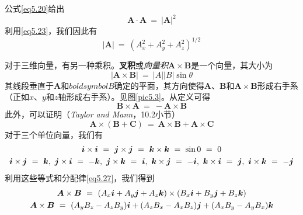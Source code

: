 \documentclass[12pt,a4paper,openany]{ctexbook}
\newcommand{\abs}[1]{\left| #1 \right|}
\begin{document}
\begin{flushleft}
公式\eqref{eq5.20}给出
\begin{equation}
    \boxed{\boldsymbol{A}\cdot\boldsymbol{A}\ =\ \abs{\boldsymbol{A}}^2} \label{eq5.24}
\end{equation}
利用\eqref{eq5.23}，我们因此有
\begin{equation}
    \abs{\boldsymbol{A}}\ =\ (A_x^2+A_y^2+A_z^2)^{1/2} \label{eq5.25}
\end{equation}

对于三维向量，有另一种乘积。\textbf{叉积}或\textit{向量积}$\boldsymbol{A}\times\boldsymbol{B}$是一个向量，其大小为
\begin{equation}
    \abs{\boldsymbol{A}\times\boldsymbol{B}}\ =\ \abs{A}\abs{B}\sin\theta \label{eq5.26}
\end{equation}
其线段垂直于$\boldsymbol{A}$和$boldsymbol{B}$确定的平面，其方向使得$\boldsymbol{A}$、$\boldsymbol{B}$和$\boldsymbol{A}\times\boldsymbol{B}$形成右手系（正如$x$、$y$和$z$轴形成右手系）。见图\ref{pic5.3}。从定义可得
\begin{equation*}
    \boldsymbol{B}\times\boldsymbol{A}\ =\ -\boldsymbol{A}\times\boldsymbol{B}
\end{equation*}
此外，可以证明（\textit{Taylor and Mann}，10.2小节）
\begin{equation}
    \boldsymbol{A}\times(\boldsymbol{B}+\boldsymbol{C})\ =\ \boldsymbol{A}\times\boldsymbol{B}+\boldsymbol{A}\times\boldsymbol{C} \label{eq5.27}
\end{equation}
对于三个单位向量，我们有
\begin{gather*}
    \boldsymbol{i}\times\boldsymbol{i}\ =\ \boldsymbol{j}\times\boldsymbol{j}\ =\ \boldsymbol{k}\times\boldsymbol{k}\ =\ \sin 0\ =\ 0 \notag \\
    \boldsymbol{i}\times\boldsymbol{j}\ =\ \boldsymbol{k},\ \boldsymbol{j}\times\boldsymbol{i}\ =\ -\boldsymbol{k},\ \boldsymbol{j}\times\boldsymbol{k}\ =\ \boldsymbol{i},\ \boldsymbol{k}\times\boldsymbol{j}\ =\ -\boldsymbol{i},\ \boldsymbol{k}\times\boldsymbol{i}\ =\ \boldsymbol{j},\ \boldsymbol{i}\times\boldsymbol{k}\ =\ -\boldsymbol{j}
\end{gather*}
利用这些等式和分配律\eqref{eq5.27}，我们得到
\begin{gather*}
    \boldsymbol{A}\times\boldsymbol{B}\ =\ (A_x\boldsymbol{i}+A_y\boldsymbol{j}+A_z\boldsymbol{k})\times(B_x\boldsymbol{i}+B_y\boldsymbol{j}+B_z\boldsymbol{k}) \notag \\
    \boldsymbol{A}\times\boldsymbol{B}\ =\ (A_yB_z-A_zB_y)\boldsymbol{i}+(A_zB_x-A_xB_z)\boldsymbol{j}+(A_xB_y-A_yB_x)\boldsymbol{k}

\end{gather*}
\end{flushleft}
\end{document}
